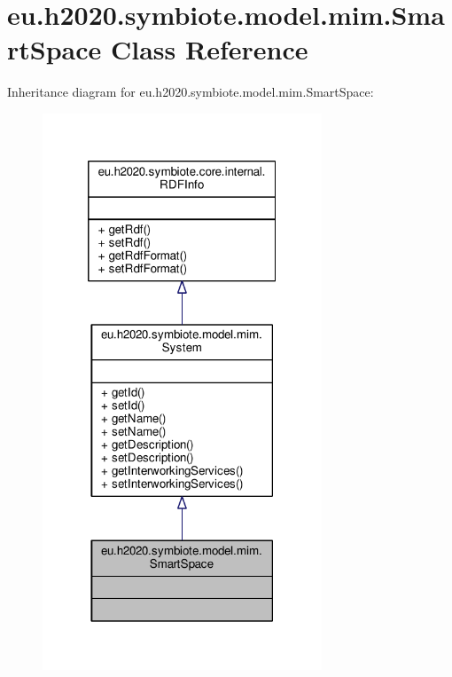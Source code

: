 \hypertarget{classeu_1_1h2020_1_1symbiote_1_1model_1_1mim_1_1SmartSpace}{}\section{eu.\+h2020.\+symbiote.\+model.\+mim.\+Smart\+Space Class Reference}
\label{classeu_1_1h2020_1_1symbiote_1_1model_1_1mim_1_1SmartSpace}


Inheritance diagram for eu.\+h2020.\+symbiote.\+model.\+mim.\+Smart\+Space\+:
\nopagebreak
\begin{figure}[H]
\begin{center}
\leavevmode
\includegraphics[width=236pt]{classeu_1_1h2020_1_1symbiote_1_1model_1_1mim_1_1SmartSpace__inherit__graph}
\end{center}
\end{figure}


